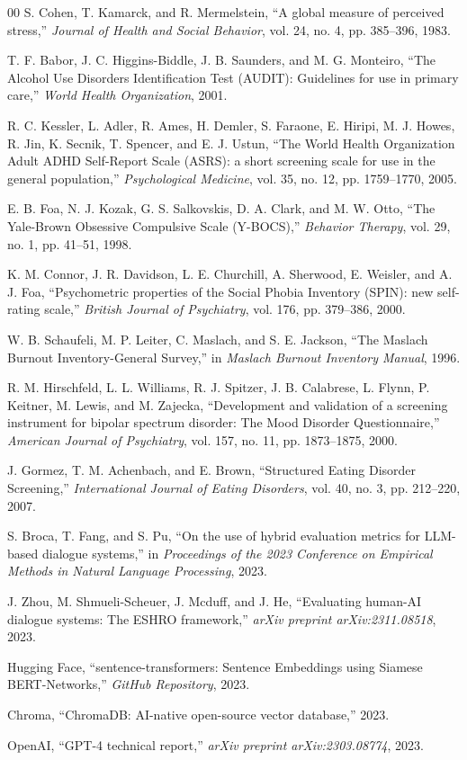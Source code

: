 \documentclass[sigconf]{acmart}
\begin{document}
\begin{thebibliography}{00}
 S. Cohen, T. Kamarck, and R. Mermelstein, ``A global measure of perceived stress,'' \textit{Journal of Health and Social Behavior}, vol. 24, no. 4, pp. 385--396, 1983.

 T. F. Babor, J. C. Higgins-Biddle, J. B. Saunders, and M. G. Monteiro, ``The Alcohol Use Disorders Identification Test (AUDIT): Guidelines for use in primary care,'' \textit{World Health Organization}, 2001.

 R. C. Kessler, L. Adler, R. Ames, H. Demler, S. Faraone, E. Hiripi, M. J. Howes, R. Jin, K. Secnik, T. Spencer, and E. J. Ustun, ``The World Health Organization Adult ADHD Self-Report Scale (ASRS): a short screening scale for use in the general population,'' \textit{Psychological Medicine}, vol. 35, no. 12, pp. 1759--1770, 2005.

 E. B. Foa, N. J. Kozak, G. S. Salkovskis, D. A. Clark, and M. W. Otto, ``The Yale-Brown Obsessive Compulsive Scale (Y-BOCS),'' \textit{Behavior Therapy}, vol. 29, no. 1, pp. 41--51, 1998.

 K. M. Connor, J. R. Davidson, L. E. Churchill, A. Sherwood, E. Weisler, and A. J. Foa, ``Psychometric properties of the Social Phobia Inventory (SPIN): new self-rating scale,'' \textit{British Journal of Psychiatry}, vol. 176, pp. 379--386, 2000.

 W. B. Schaufeli, M. P. Leiter, C. Maslach, and S. E. Jackson, ``The Maslach Burnout Inventory-General Survey,'' in \textit{Maslach Burnout Inventory Manual}, 1996.

 R. M. Hirschfeld, L. L. Williams, R. J. Spitzer, J. B. Calabrese, L. Flynn, P. Keitner, M. Lewis, and M. Zajecka, ``Development and validation of a screening instrument for bipolar spectrum disorder: The Mood Disorder Questionnaire,'' \textit{American Journal of Psychiatry}, vol. 157, no. 11, pp. 1873--1875, 2000.

 J. Gormez, T. M. Achenbach, and E. Brown, ``Structured Eating Disorder Screening,'' \textit{International Journal of Eating Disorders}, vol. 40, no. 3, pp. 212--220, 2007.

 S. Broca, T. Fang, and S. Pu, ``On the use of hybrid evaluation metrics for LLM-based dialogue systems,'' in \textit{Proceedings of the 2023 Conference on Empirical Methods in Natural Language Processing}, 2023.

 J. Zhou, M. Shmueli-Scheuer, J. Mcduff, and J. He, ``Evaluating human-AI dialogue systems: The ESHRO framework,'' \textit{arXiv preprint arXiv:2311.08518}, 2023.

 Hugging Face, ``sentence-transformers: Sentence Embeddings using Siamese BERT-Networks,'' \textit{GitHub Repository}, 2023.

 Chroma, ``ChromaDB: AI-native open-source vector database,'' 2023.

 OpenAI, ``GPT-4 technical report,'' \textit{arXiv preprint arXiv:2303.08774}, 2023.

\end{thebibliography}
\end{document}
